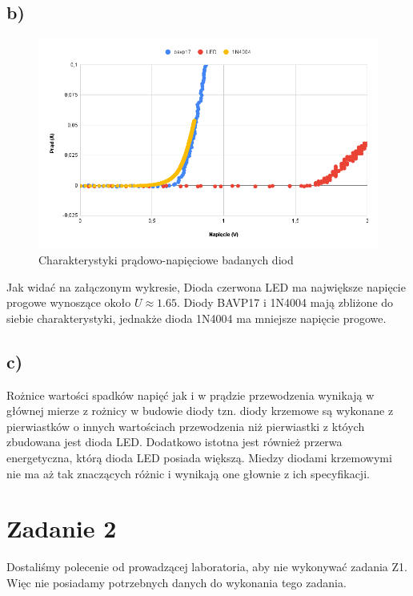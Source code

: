 \documentclass{article}
\begin{document}
\subsection{b)} 
\centering
\begin{figure}[h]
  \includegraphics[scale=0.5]{./img/chart.png}
  \caption{Charakterystyki prądowo-napięciowe badanych diod}
\end{figure}
Jak widać na załączonym wykresie, Dioda czerwona LED ma największe napięcie progowe wynoszące około $U \approx 1.65$. Diody BAVP17 i 1N4004 mają zbliżone do siebie charakterystyki, 
jednakże dioda 1N4004 ma mniejsze napięcie progowe. 
\raggedright
\subsection{c)}
\centering
Rożnice wartości spadków napięć jak i w prądzie przewodzenia wynikają w głównej mierze z rożnicy w budowie diody tzn. diody krzemowe są wykonane z  pierwiastków o innych wartościach przewodzenia niż pierwiastki z któych zbudowana jest dioda LED. Dodatkowo istotna jest również przerwa energetyczna, którą dioda LED posiada większą. Miedzy diodami krzemowymi nie ma aż tak znaczących różnic i wynikają one głownie z ich specyfikacji.
\raggedright
\section{Zadanie 2}
Dostaliśmy polecenie od prowadzącej laboratoria, aby nie wykonywać zadania Z1. Więc nie posiadamy potrzebnych danych do wykonania tego zadania.
\raggedright
\end{document}
